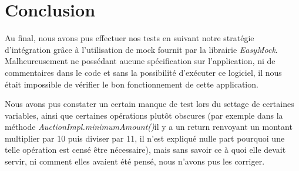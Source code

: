 \documentclass{article}
\begin{document}
\newpage
\section*{Conclusion}
Au final, nous avons pus effectuer nos tests en suivant notre stratégie d'intégration grâce à l'utilisation de mock fournit par la librairie \textit{EasyMock}. Malheureusement ne possédant aucune spécification sur l'application, ni de commentaires dans le code et sans la possibilité d'exécuter ce logiciel, il nous était impossible de vérifier le bon fonctionnement de cette application.

Nous avons pus constater un certain manque de test lors du settage de certaines variables, ainsi que certaines opérations plutôt obscures (par exemple dans la méthode  \textit{AuctionImpl.minimumAmount()}il y a un return renvoyant un montant multiplier par 10 puis diviser par 11, il n'est expliqué nulle part pourquoi une telle opération est censé être nécessaire), mais sans savoir ce à quoi elle devait servir, ni comment elles avaient été pensé, nous n'avons pus les corriger.
\end{document}
